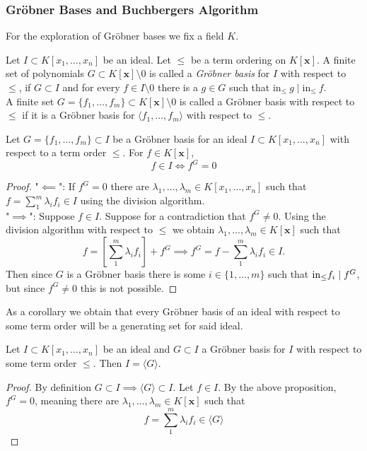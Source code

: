 \subsubsection{Gröbner Bases and Buchbergers Algorithm}
For the exploration of Gröbner bases we fix a field $K$.
\begin{definition}\label{GBDef}
    Let $I\subset K[x_1,\dots,x_n]$ be an ideal. Let $\leq$ be a term ordering on $K[\mathbf{x}]$. A finite set of polynomials $G\subset K[\mathbf{x}]\setminus 0$ is called a \textit{Gröbner basis} for $I$ with respect to $\leq$, if $G\subset I$ and for every $f\in I\setminus 0$ there is a $g\in G$ such that $\text{in}_\leq\ g \mid \text{in}_\leq \ f$.\\
    A finite set $G=\{f_1,\dots,f_m\}\subset K[\mathbf{x}]\setminus 0$ is called a Gröbner basis with respect to $\leq$ if it is a Gröbner basis for $\langle f_1,\dots,f_m\rangle$ with respect to $\leq$.
\end{definition}
\begin{proposition}\label{GBCriterionForCheckingMembership}
    Let $G=\{f_1,\dots,f_m\}\subset I$ be a Gröbner basis for an ideal $I\subset K[x_1,\dots,x_n]$ with respect to a term order $\leq$. For $f\in K[\mathbf{x}]$,
    $$f\in I \iff f^G = 0$$
\end{proposition}
\begin{proof}
    "$\impliedby$": If $f^G=0$ there are $\lambda_1,\dots,\lambda_m\in K[x_1,\dots,x_n]$ such that $f = \sum_1^m \lambda_if_i\in I$ using the division algorithm.\\
    "$\implies$": Suppose $f\in I$. Suppose for a contradiction that $f^G\neq 0$. Using the division algorithm with respect to $\leq$ we obtain $\lambda_1,\dots,\lambda_m\in K[\mathbf{x}]$ such that 
    $$f = \left[\sum_1^m \lambda_if_i\right]+f^G\implies f^G = f-\sum_1^m \lambda_if_i\in I.$$
    Then since $G$ is a Gröbner basis there is some $i\in\{1,\dots,m\}$ such that $\mathrm{in}_\leq f_i\mid f^G$, but since $f^G\neq0$ this is not possible.
\end{proof}
As a corollary we obtain that every Gröbner basis of an ideal with respect to some term order will be a generating set for said ideal.
\begin{corollary}
    Let $I\subset K[x_1,\dots,x_n]$ be an ideal and $G\subset I$ a Gröbner basis for $I$ with respect to some term order $\leq$. Then $I=\langle G\rangle$.
\end{corollary}
\begin{proof}
    By definition $G\subset I\implies \langle G\rangle \subset I$. Let $f\in I$. By the above proposition, $f^G=0$, meaning there are $\lambda_1,\dots,\lambda_m\in K[\mathbf{x}]$ such that 
    $$f = \sum_1^m \lambda_if_i\in \langle G\rangle$$
\end{proof}
